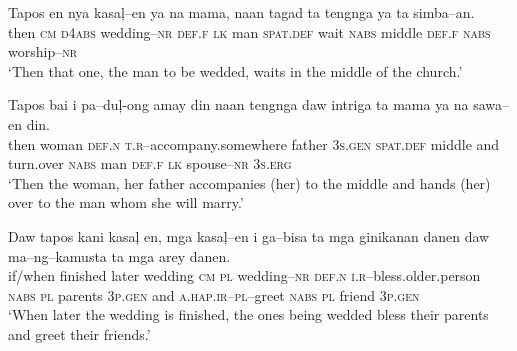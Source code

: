 \ea
\gll  Tapos  en  nya  kasa\c{l}--en  ya  na  mama,  naan    tagad  ta  tengnga  ya  ta  simba--an. \\
then  \textsc{cm}  \textsc{d}4\textsc{abs}  wedding--\textsc{nr}  \textsc{def.f}  \textsc{lk}  man  \textsc{spat.def}
wait  \textsc{nabs}  middle  \textsc{def.f}  \textsc{nabs}  worship--\textsc{nr} \\
\glt  `Then that one, the man to be wedded, waits in the middle of the church.’
\z

\ea
\gll  Tapos  bai  i  pa--du\c{l}{}-ong  amay  din  naan   tengnga  daw  intriga  ta  mama  ya  na  sawa--en  din. \\
then  woman  \textsc{def.n}  \textsc{t.r}--accompany.somewhere  father  3\textsc{s.gen}  \textsc{spat.def}
middle  and  turn.over  \textsc{nabs}  man  \textsc{def.f}  \textsc{lk}  spouse--\textsc{nr}  3\textsc{s.erg} \\
\glt `Then the woman, her father accompanies (her) to the middle and hands (her) over to the man whom she will marry.’
\z

\ea
\gll  Daw  tapos  kani  kasa\c{l}  en,  mga  kasa\c{l}--en  i   ga--bisa  ta  mga  ginikanan  danen  daw    ma--ng--kamusta  ta  mga  arey  danen. \\
if/when  finished   later  wedding  \textsc{cm}  \textsc{pl}  wedding--\textsc{nr}  \textsc{def.n}
\textsc{i.r}--bless.older.person  \textsc{nabs}  \textsc{pl}  parents  3\textsc{p.gen}  and
\textsc{a.hap.ir--pl--}greet  \textsc{nabs}  \textsc{pl}  friend  3\textsc{p.gen} \\
\glt  `When later the wedding is finished, the ones being wedded bless their parents and greet their friends.’
\z
